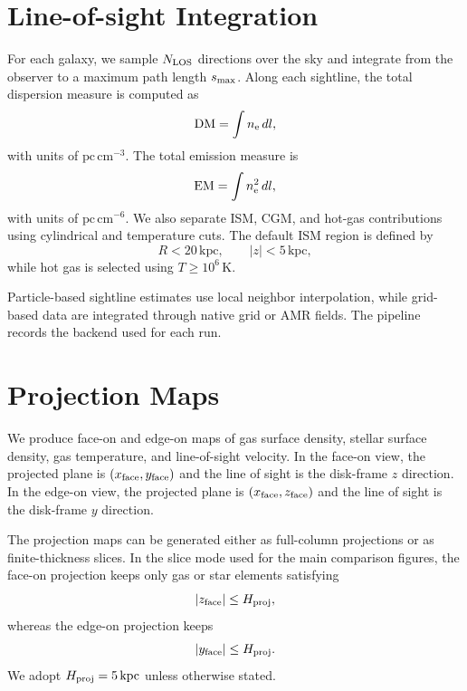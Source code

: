 \documentclass[twocolumn]{aastex631}
\newcommand{\DM}{\mathrm{DM}}
\newcommand{\EM}{\mathrm{EM}}
\newcommand{\ne}{n_{\rm e}}
\newcommand{\pc}{\mathrm{pc}}
\newcommand{\kpc}{\mathrm{kpc}}
\begin{document}
\section{Line-of-sight Integration}\label{sec:los}
For each galaxy, we sample $N_{\rm LOS}$ directions over the sky and integrate from the observer to a maximum path length $s_{\rm max}$.  Along each sightline, the total dispersion measure is computed as
\begin{equation}
    \DM = \int \ne\,dl,
\end{equation}
with units of $\pc\,\mathrm{cm}^{-3}$.  The total emission measure is
\begin{equation}
    \EM = \int \ne^2\,dl,
\end{equation}
with units of $\pc\,\mathrm{cm}^{-6}$.  We also separate ISM, CGM, and hot-gas contributions using cylindrical and temperature cuts.  The default ISM region is defined by
\begin{equation}
    R < 20\,\kpc, \qquad |z| < 5\,\kpc,
\end{equation}
while hot gas is selected using $T \geq 10^6\,\mathrm{K}$.

Particle-based sightline estimates use local neighbor interpolation, while grid-based data are integrated through native grid or AMR fields.  The pipeline records the backend used for each run.

\section{Projection Maps}\label{sec:projection}
We produce face-on and edge-on maps of gas surface density, stellar surface density, gas temperature, and line-of-sight velocity.  In the face-on view, the projected plane is $(x_{\rm face}, y_{\rm face})$ and the line of sight is the disk-frame $z$ direction.  In the edge-on view, the projected plane is $(x_{\rm face}, z_{\rm face})$ and the line of sight is the disk-frame $y$ direction.

The projection maps can be generated either as full-column projections or as finite-thickness slices.  In the slice mode used for the main comparison figures, the face-on projection keeps only gas or star elements satisfying
\begin{equation}
    |z_{\rm face}| \leq H_{\rm proj},
\end{equation}
whereas the edge-on projection keeps
\begin{equation}
    |y_{\rm face}| \leq H_{\rm proj}.
\end{equation}
We adopt $H_{\rm proj}=5\,\kpc$ unless otherwise stated.
\end{document}
